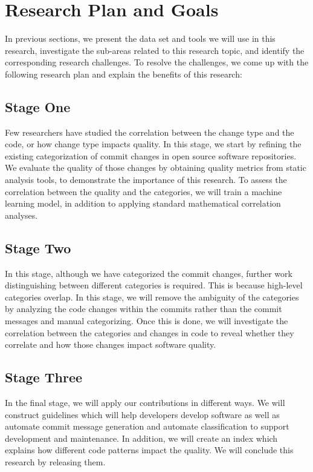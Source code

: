 \section{Research Plan and Goals}
\label{sec:goal}

In previous sections, we present the data set and tools we will use in this research, investigate the sub-areas related to this research topic, and identify the corresponding research challenges.
To resolve the challenges, we come up with the following research plan and explain the benefits of this research:

\subsection{Stage One}
Few researchers have studied the correlation between the change type and the code, or how change type impacts quality. 
In this stage, we start by refining the existing categorization of commit changes in open source software repositories.
We evaluate the quality of those changes by obtaining quality metrics from static analysis tools, to demonstrate the importance of this research.
To assess the correlation between the quality and the categories, we will train a machine learning model, in addition to applying standard mathematical correlation analyses.

\subsection{Stage Two}
In this stage, although we have categorized the commit changes, further work distinguishing between different categories is required.
This is because high-level categories overlap.
In this stage, we will remove the ambiguity of the categories by analyzing the code changes within the commits rather than the commit messages and manual categorizing.
Once this is done, we will investigate the correlation between the categories and changes in code to reveal whether they correlate and how those changes impact software quality.

\subsection{Stage Three}
In the final stage, we will apply our contributions in different ways.
We will construct guidelines which will help developers develop software as well as automate commit message generation and automate classification to support development and maintenance.
In addition, we will create an index which explains how different code patterns impact the quality.
We will conclude this research by releasing them. 


